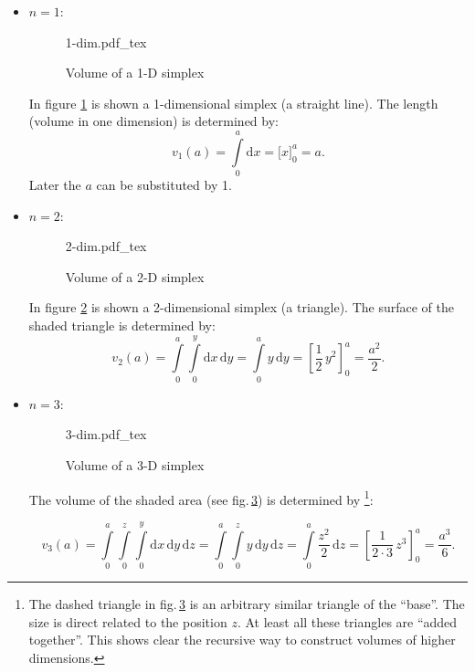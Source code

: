 \documentclass[11pt,paper=a4,oneside,ngerman,english,parskip=half]{scrartcl}
\begin{document}
\begin{itemize}
\item $n = 1$:
\begin{figure}
\centering
{1-dim.pdf_tex}
\caption{Volume of a 1-D simplex}
\label{fig.1-dim}
\end{figure}

In figure \ref{fig.1-dim} is shown a 1-dimensional simplex (a straight line). The length (volume in one dimension) is determined by:
\begin{equation}
v_1(a) = \int\limits_{0}^{a}\text{d}x =\biggl[x\biggl]_{0}^{a} = a.
\label{eq:1-dim-vol}
\end{equation}
Later the $a$ can be substituted by 1.

\item $n = 2$:
\begin{figure}
\centering
{2-dim.pdf_tex}
\caption{Volume of a 2-D simplex}
\label{fig.2-dim}
\end{figure}

In figure \ref{fig.2-dim} is shown a 2-dimensional simplex (a triangle). The surface of the shaded triangle is determined by:
\begin{equation}
v_2(a) = \int\limits_{0}^{a} \int\limits_{0}^{y} \text{d}x\,\text{d}y  = \int\limits_{0}^{a} y \,\text{d}y = \left[\frac{1}{2}\,y^2\right]_{0}^{a} = \frac{a^2}{2}.
\end{equation}

\item $n = 3$:
\begin{figure}
\centering
{3-dim.pdf_tex}
\caption{Volume of a 3-D simplex}
\label{fig.3-dim}
\end{figure}

The volume of the shaded area (see fig.\,\ref{fig.3-dim}) is determined by \footnote{The dashed triangle in fig.\,\ref{fig.3-dim} is an arbitrary similar triangle of the \enquote{base}. The size is direct related to the position $z$. At least all these triangles are \enquote{added together}. This shows clear the recursive way to construct volumes of higher dimensions.}:

\begin{equation}
v_3(a) = \int\limits_{0}^{a} \int\limits_{0}^{z} \int\limits_{0}^{y}\text{d}x\,\text{d}y\,\text{d}z  = \int\limits_{0}^{a} \int\limits_{0}^{z} y \,\text{d}y\,\text{d}z = \int\limits_{0}^{a} \frac{z^2}{2} \,\text{d}z =\left[\frac{1}{2\cdot 3}\,z^3\right]_{0}^{a} = \frac{a^3}{6}.
\end{equation}

\end{itemize}
\end{document}
